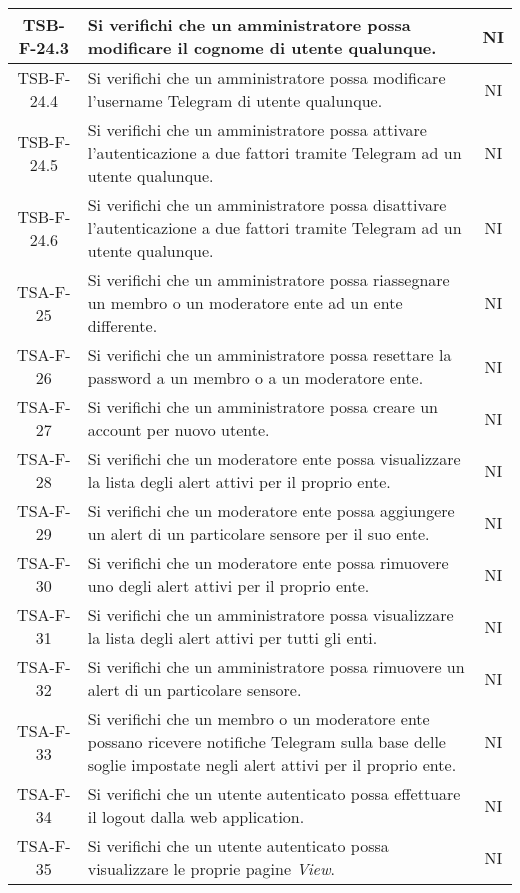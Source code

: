 \begin{center}
\begin{longtable}{|c|p{10cm}|c|}
			 \hline
			 TSB-F-24.3 & Si verifichi che un amministratore possa modificare il cognome di utente qualunque. & NI \\
			 \hline
			 TSB-F-24.4 & Si verifichi che un amministratore possa modificare l'username Telegram di utente qualunque. & NI \\
			 \hline
			 TSB-F-24.5 & Si verifichi che un amministratore possa attivare l'autenticazione a due fattori tramite Telegram ad un utente qualunque. & NI \\
			 \hline
			 TSB-F-24.6 & Si verifichi che un amministratore possa disattivare l'autenticazione a due fattori tramite Telegram ad un utente qualunque. & NI \\
			 \hline
			 TSA-F-25 & Si verifichi che un amministratore possa riassegnare un membro o un moderatore ente ad un ente differente. & NI \\
			 \hline
			 TSA-F-26 & Si verifichi che un amministratore possa resettare la password a un membro o a un moderatore ente. & NI \\
			 \hline
			 TSA-F-27 & Si verifichi che un amministratore possa creare un account per nuovo utente. & NI \\  
			 \hline
			 TSA-F-28 & Si verifichi che un moderatore ente possa visualizzare la lista degli alert attivi per il proprio ente. & NI \\
			 \hline
			 TSA-F-29 & Si verifichi che un moderatore ente possa aggiungere un alert di un particolare sensore per il suo ente. & NI \\
			 \hline
			 TSA-F-30 & Si verifichi che un moderatore ente possa rimuovere uno degli alert attivi per il proprio ente. & NI \\
			 \hline
			 TSA-F-31 & Si verifichi che un amministratore possa visualizzare la lista degli alert attivi per tutti gli enti. & NI \\
			 \hline
			 TSA-F-32 & Si verifichi che un amministratore possa rimuovere un alert di un particolare sensore. & NI \\
			 \hline
			 TSA-F-33 & Si verifichi che un membro o un moderatore ente possano ricevere notifiche Telegram sulla base delle soglie impostate negli alert attivi per il proprio ente. & NI \\
			 \hline
			 TSA-F-34 & Si verifichi che un utente autenticato possa effettuare il logout dalla web application. & NI \\
			 \hline
			 TSA-F-35 & Si verifichi che un utente autenticato possa visualizzare le proprie pagine \textit{View}. & NI \\

\end{longtable}
\end{center}
